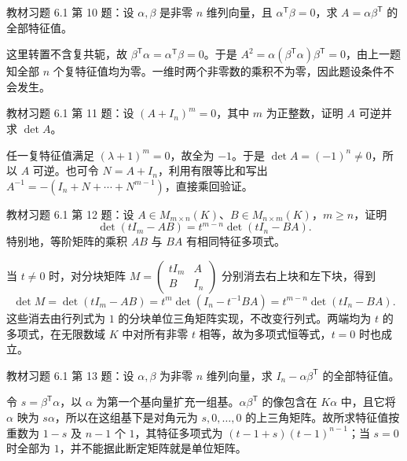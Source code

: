 \begin{example}
\label{ex:xie-61-10}
教材习题 6.1 第 10 题：设 $\alpha,\beta$ 是非零 $n$ 维列向量，且 $\alpha^{\mathsf T}\beta=0$，求 $A=\alpha\beta^{\mathsf T}$ 的全部特征值。
\end{example}
\begin{solve}
这里转置不含复共轭，故 $\beta^{\mathsf T}\alpha=\alpha^{\mathsf T}\beta=0$。于是 $A^2=\alpha(\beta^{\mathsf T}\alpha)\beta^{\mathsf T}=0$，由上一题知全部 $n$ 个复特征值均为零。一维时两个非零数的乘积不为零，因此题设条件不会发生。
\end{solve}

\begin{example}
\label{ex:xie-61-11}
教材习题 6.1 第 11 题：设 $(A+I_n)^m=0$，其中 $m$ 为正整数，证明 $A$ 可逆并求 $\det A$。
\end{example}
\begin{solve}
任一复特征值满足 $(\lambda+1)^m=0$，故全为 $-1$。于是 $\det A=(-1)^n\ne0$，所以 $A$ 可逆。也可令 $N=A+I_n$，利用有限等比和写出 $A^{-1}=-(I_n+N+\cdots+N^{m-1})$，直接乘回验证。
\end{solve}

\begin{example}
\label{ex:xie-61-12}
教材习题 6.1 第 12 题：设 $A\in M_{m\times n}(K)$、$B\in M_{n\times m}(K)$，$m\geq n$，证明
\begin{equation}
\label{eq:xie-ab-ba-characteristic}
 \det(tI_m-AB)=t^{m-n}\det(tI_n-BA).
\end{equation}
特别地，等阶矩阵的乘积 $AB$ 与 $BA$ 有相同特征多项式。
\end{example}
\begin{solve}
当 $t\ne0$ 时，对分块矩阵 $M=\begin{pmatrix}tI_m&A\\B&I_n\end{pmatrix}$ 分别消去右上块和左下块，得到
\[
 \det M=\det(tI_m-AB)
 =t^m\det(I_n-t^{-1}BA)
 =t^{m-n}\det(tI_n-BA).
\]
这些消去由行列式为 $1$ 的分块单位三角矩阵实现，不改变行列式。两端均为 $t$ 的多项式，在无限数域 $K$ 中对所有非零 $t$ 相等，故为多项式恒等式，$t=0$ 时也成立。
\end{solve}

\begin{example}
\label{ex:xie-61-13}
教材习题 6.1 第 13 题：设 $\alpha,\beta$ 为非零 $n$ 维列向量，求 $I_n-\alpha\beta^{\mathsf T}$ 的全部特征值。
\end{example}
\begin{solve}
令 $s=\beta^{\mathsf T}\alpha$，以 $\alpha$ 为第一个基向量扩充一组基。$\alpha\beta^{\mathsf T}$ 的像包含在 $K\alpha$ 中，且它将 $\alpha$ 映为 $s\alpha$，所以在这组基下是对角元为 $s,0,\ldots,0$ 的上三角矩阵。故所求特征值按重数为 $1-s$ 及 $n-1$ 个 $1$，其特征多项式为 $(t-1+s)(t-1)^{n-1}$；当 $s=0$ 时全部为 $1$，并不能据此断定矩阵就是单位矩阵。
\end{solve}

